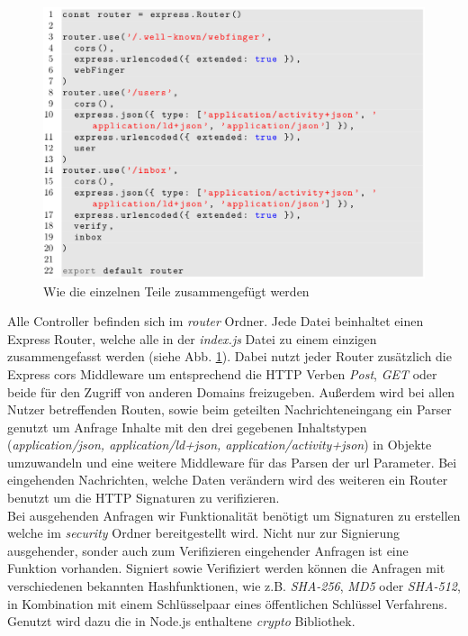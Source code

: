 \begin{figure}[H]
	\centering
	\includegraphics[width=15cm]{figures/router-index.png}
	\caption{Wie die einzelnen Teile zusammengefügt werden}
	\label{fig:router-index}
\end{figure}
Alle Controller befinden sich im  \textit{router} Ordner. Jede Datei beinhaltet einen Express Router, welche alle in der \textit{index.js} Datei zu einem einzigen zusammengefasst werden (siehe Abb. \ref{fig:router-index}). Dabei nutzt jeder Router zusätzlich die Express \gls{cors} Middleware um entsprechend die HTTP Verben \textit{Post}, \textit{GET} oder beide für den Zugriff von anderen Domains freizugeben. Außerdem wird bei allen Nutzer betreffenden Routen, sowie beim geteilten Nachrichteneingang ein Parser genutzt um Anfrage Inhalte mit den drei gegebenen Inhaltstypen (\textit{application/json, application/ld+json, application/activity+json}) in Objekte umzuwandeln und eine weitere Middleware für das Parsen der \gls{url} Parameter. Bei eingehenden Nachrichten, welche Daten verändern wird des weiteren ein Router benutzt um die HTTP Signaturen zu verifizieren.\\

Bei ausgehenden Anfragen wir Funktionalität benötigt um Signaturen zu erstellen welche im \textit{security} Ordner bereitgestellt wird. Nicht nur zur Signierung ausgehender, sonder auch zum Verifizieren eingehender Anfragen ist eine Funktion vorhanden. Signiert sowie Verifiziert werden können die Anfragen mit verschiedenen bekannten Hashfunktionen, wie z.B. \textit{SHA-256}, \textit{MD5} oder \textit{SHA-512}, in Kombination mit einem Schlüsselpaar eines öffentlichen Schlüssel Verfahrens. Genutzt wird dazu die in Node.js enthaltene \textit{crypto} Bibliothek.\\

